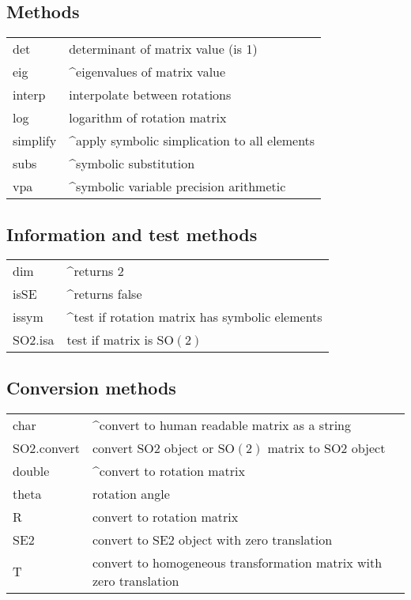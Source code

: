 \subsection*{Methods}
\begin{longtable}{lp{120mm}}
det & determinant of matrix value (is 1)\\ 
eig & \textasciicircum eigenvalues of matrix value\\ 
interp & interpolate between rotations\\ 
log & logarithm of rotation matrix\\ 
simplify & \textasciicircum apply symbolic simplication to all elements\\ 
subs & \textasciicircum symbolic substitution\\ 
vpa & \textasciicircum symbolic variable precision arithmetic\\ 
\end{longtable}\vspace{1ex}

\subsection*{Information and test methods}
\begin{longtable}{lp{120mm}}
dim & \textasciicircum returns 2\\ 
isSE & \textasciicircum returns false\\ 
issym & \textasciicircum test if rotation matrix has symbolic elements\\ 
SO2.isa & test if matrix is $\mbox{SO}(2)$\\ 
\end{longtable}\vspace{1ex}

\subsection*{Conversion methods}
\begin{longtable}{lp{120mm}}
char & \textasciicircum convert to human readable matrix as a string\\ 
SO2.convert & convert SO2 object or $\mbox{SO}(2)$ matrix to SO2 object\\ 
double & \textasciicircum convert to rotation matrix\\ 
theta & rotation angle\\ 
R & convert to rotation matrix\\ 
SE2 & convert to SE2 object with zero translation\\ 
T & convert to homogeneous transformation matrix with zero translation\\ 
\end{longtable}\vspace{1ex}

